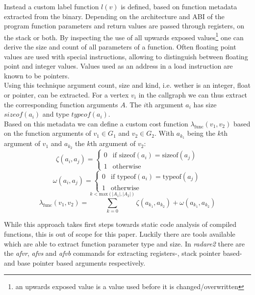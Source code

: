 \documentclass[
    12pt,                               %
    DIV=14,                     %
    parskip=half+,              %
    bigheadings,                %
    cleardoubleempty,   %
    halfparskip,                %
    ]{scrreprt} %
\begin{document}
Instead a custom label function $l(v)$ is defined, based on function metadata extracted from the binary. Depending on the architecture and ABI of the program function parameters and return values are passed through registers, on the stack or both. By inspecting the use of all upwards exposed values\footnote{an upwards exposed value is a value used before it is changed/overwritten\cite{compilerbook, regalloc}} one can derive the size and count of all parameters of a function. Often floating point values are used with special instructions, allowing to distinguish between floating point and integer values. Values used as an address in a load instruction are known to be pointers. \\
Using this technique argument count, size and kind, i.e. wether is an integer, float or pointer, can be extracted. For a vertex $v_i$ in the callgraph we can thus extract the corresponding function arguments $A$. The $i$th argument $a_i$ has size $sizeof(a_i)$ and type $typeof(a_i)$. \\
Based on this metadata we can define a custom cost function $\lambda_{\text{func}}(v_1, v_2)$ based on the function arguments of $v_1 \in G_1$ and $v_2 \in G_2$. With $a_{k_1}$ being the $k$th argument of $v_1$ and $a_{k_2}$ the $k$th argument of $v_2$:
\begin{equation}
	\zeta(a_i, a_j) = \begin{cases}
		0 & \text{if } \text{sizeof}(a_i) = \text{sizeof}(a_j) \\
		1 & \text{otherwise}
	\end{cases}
\end{equation}
\begin{equation}
	\omega(a_i, a_j) = \begin{cases}
		0 & \text{if } \text{typeof}(a_i) = \text{typeof}(a_j) \\
		1 & \text{otherwise}
	\end{cases}
\end{equation}
\begin{equation}
	\lambda_{\text{func}}(v_1, v_2) = \sum_{k = 0}^{k < \text{max}(|A_1|, |A_2|)} \zeta(a_{k_1}, a_{k_2}) + \omega(a_{k_1}, a_{k_2})
\end{equation}

While this approach takes first steps towards static code analysis of compiled functions, this is out of scope for this paper. Luckily there are tools available which are able to extract function parameter type and size. In \textit{radare2} there are the \textit{afvr}, \textit{afvs} and \textit{afvb} commands for extracting registers-, stack pointer based- and base pointer based arguments respectively.  %
\end{document}
